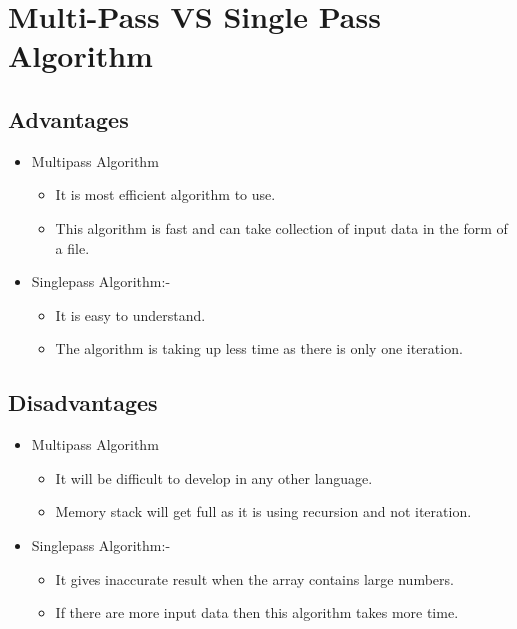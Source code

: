\documentclass[11pt]{report}
\begin{document}
\section{Multi-Pass VS Single Pass Algorithm}

\subsection{\Large \vspace{0.2 cm}Advantages}
\begin{itemize}
\item Multipass Algorithm 
\begin{itemize}
    \item It is most efficient algorithm to use.
    \item This algorithm is fast and can take collection of input data in the form of a file.
\end{itemize}

\item Singlepass Algorithm:-
\begin{itemize}
\item It is easy to understand.
\item The algorithm is taking up less time as there is only one iteration.
\end{itemize}
\end{itemize}

\subsection{\Large \vspace{0.2 cm}Disadvantages}
\begin{itemize}
\item Multipass Algorithm 

\begin{itemize}
    \item It will be difficult to develop in any other language.
    \item Memory stack will get full as it is using recursion and not iteration.
\end{itemize}

\item Singlepass Algorithm:-
\begin{itemize}
\item It gives inaccurate result when the array contains large numbers.
\item If there are more input data then this algorithm takes more time.
\end{itemize}
\end{itemize}
\end{document}
